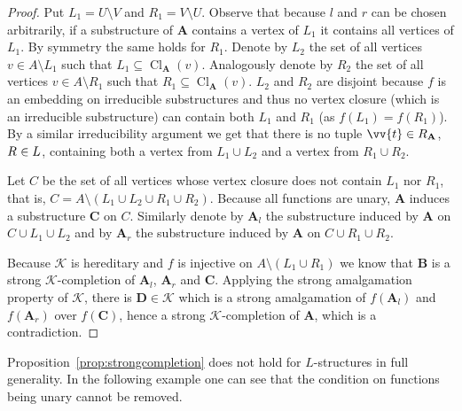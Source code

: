 \documentclass{elsarticle}
\def\Cl{\mathop{\mathrm{Cl}}\nolimits}
\def\str#1{\mathbf {#1}}
\def\nbrel#1#2{R\ifstrempty{#1}{}{_{#1}}\ifstrempty{#2}{}{^{#2}}}
\def\rel#1#2{\nbrel{\ifstrempty{#1}{}{\str{#1}}}{#2}}
\def\K{{\mathcal K}}
\theoremstyle{plain}
\theoremstyle{definition}
\theoremstyle{remark}
\begin{document}
\begin{proof}
Put $L_1=U\setminus V$ and $R_1=V\setminus U$. Observe that because $l$ and $r$ can be chosen arbitrarily, if a substructure
of $\str{A}$ contains a vertex of $L_1$ it contains all vertices of $L_1$. By symmetry the same holds for
 $R_1$.  Denote by $L_2$ the set of all vertices $v\in A\setminus
L_1$ such that $L_1\subseteq \Cl_\str{A}(v)$.  Analogously denote by $R_2$ the set of
all vertices $v\in A\setminus R_1$ such that $R_1\subseteq \Cl_\str{A}(v)$.  $L_2$
and $R_2$ are disjoint because $f$ is an embedding on irreducible substructures
and thus no vertex closure (which is an irreducible substructure) can contain
both $L_1$ and $R_1$ (as $f(L_1)=f(R_1)$). By a similar irreducibility argument we get that there is no tuple $\vv{t}\in \rel{A}{}$, $\rel{}{}\in L$, containing both a vertex from $L_1\cup L_2$ and a vertex from $R_1\cup R_2$.

Let $C$ be the set of all vertices
whose vertex closure does not contain $L_1$ nor $R_1$, that is, $C=A\setminus (L_1\cup L_2\cup R_1\cup R_2)$.  
Because all functions are unary, $\str{A}$ induces a substructure $\str{C}$ on $C$.
Similarly denote by $\str{A}_l$ the substructure induced by $\str{A}$ on $C\cup L_1\cup L_2$ 
and by $\str{A}_r$ the substructure induced by $\str{A}$ on $C\cup R_1\cup R_2$.

Because $\K$ is hereditary and $f$ is injective on $A\setminus (L_1\cup R_1)$ we know that $\str B$ is a strong $\mathcal K$-completion of $\str{A}_l$, $\str{A}_r$ and $\str{C}$.
Applying the strong amalgamation property of $\K$,
there is $\str{D}\in \mathcal K$ which is a strong amalgamation of $f(\str{A}_l)$ and $f(\str{A}_r)$
over $f(\str{C})$, hence a strong $\K$-completion of $\str A$, which is a contradiction.
\end{proof}
Proposition~\ref{prop:strongcompletion} does not hold for $L$-structures in full generality. 
In the following example one can see that the condition on functions being unary cannot be removed.
\end{document}
